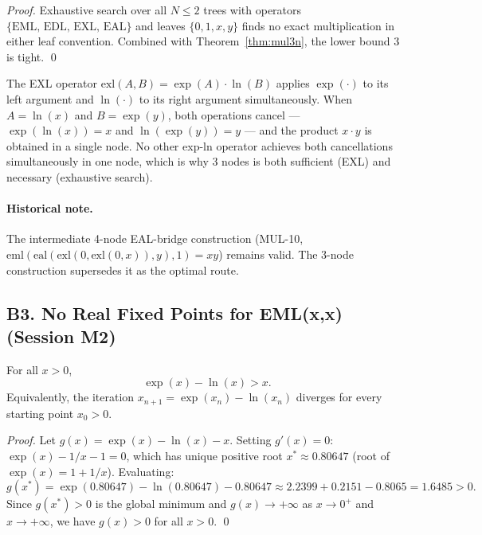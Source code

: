 \begin{proof}
Exhaustive search over all $N \leq 2$ trees with operators
$\{\mathrm{EML},\, \mathrm{EDL},\, \mathrm{EXL},\, \mathrm{EAL}\}$
and leaves $\{0, 1, x, y\}$ finds no exact multiplication in either leaf
convention. Combined with Theorem~\ref{thm:mul3n}, the lower bound 3 is tight. \qed
\end{proof}

\begin{remark}
The EXL operator $\mathrm{exl}(A, B) = \exp(A)\cdot\ln(B)$ applies $\exp(\cdot)$
to its left argument and $\ln(\cdot)$ to its right argument simultaneously.
When $A = \ln(x)$ and $B = \exp(y)$, both operations cancel — $\exp(\ln(x)) = x$
and $\ln(\exp(y)) = y$ — and the product $x \cdot y$ is obtained in a single node.
No other exp-ln operator achieves both cancellations simultaneously in one node,
which is why 3 nodes is both sufficient (EXL) and necessary (exhaustive search).
\end{remark}

\paragraph{Historical note.} The intermediate 4-node EAL-bridge construction
(MUL-10, $\mathrm{eml}(\mathrm{eal}(\mathrm{exl}(0,\mathrm{exl}(0,x)),y),1) = xy$)
remains valid. The 3-node construction supersedes it as the optimal route.

\subsection*{B3. No Real Fixed Points for EML(x,x) (Session M2)}

\begin{theorem}
\label{thm:nofixedpoints}
For all $x > 0$,
\[
  \exp(x) - \ln(x) > x.
\]
Equivalently, the iteration $x_{n+1} = \exp(x_n) - \ln(x_n)$ diverges
for every starting point $x_0 > 0$.
\end{theorem}

\begin{proof}
Let $g(x) = \exp(x) - \ln(x) - x$. Setting $g'(x) = 0$:
$\exp(x) - 1/x - 1 = 0$, which has unique positive root $x^* \approx 0.80647$
(root of $\exp(x) = 1 + 1/x$). Evaluating:
\[
  g(x^*) = \exp(0.80647) - \ln(0.80647) - 0.80647
           \approx 2.2399 + 0.2151 - 0.8065 = 1.6485 > 0.
\]
Since $g(x^*) > 0$ is the global minimum and $g(x) \to +\infty$ as
$x \to 0^+$ and $x \to +\infty$, we have $g(x) > 0$ for all $x > 0$. \qed
\end{proof}

